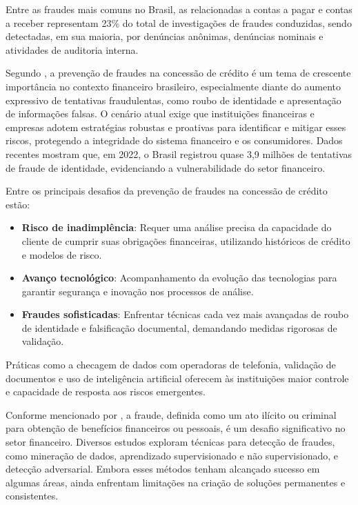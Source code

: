 \documentclass[12pt,a4paper]{article}
\begin{document}
Entre as fraudes mais comuns no Brasil, as relacionadas a contas a pagar e contas a receber representam 23\% do total de investigações de fraudes conduzidas, sendo detectadas, em sua maioria, por denúncias anônimas, denúncias nominais e atividades de auditoria interna.

Segundo \cite{thinkdata2024}, a prevenção de fraudes na concessão de crédito é um tema de crescente importância no contexto financeiro brasileiro, especialmente diante do aumento expressivo de tentativas fraudulentas, como roubo de identidade e apresentação de informações falsas. O cenário atual exige que instituições financeiras e empresas adotem estratégias robustas e proativas para identificar e mitigar esses riscos, protegendo a integridade do sistema financeiro e os consumidores. Dados recentes mostram que, em 2022, o Brasil registrou quase 3,9 milhões de tentativas de fraude de identidade, evidenciando a vulnerabilidade do setor financeiro.

Entre os principais desafios da prevenção de fraudes na concessão de crédito estão:
\begin{itemize}
    \item \textbf{Risco de inadimplência}: Requer uma análise precisa da capacidade do cliente de cumprir suas obrigações financeiras, utilizando históricos de crédito e modelos de risco.
    \item \textbf{Avanço tecnológico}: Acompanhamento da evolução das tecnologias para garantir segurança e inovação nos processos de análise.
    \item \textbf{Fraudes sofisticadas}: Enfrentar técnicas cada vez mais avançadas de roubo de identidade e falsificação documental, demandando medidas rigorosas de validação.
\end{itemize}

Práticas como a checagem de dados com operadoras de telefonia, validação de documentos e uso de inteligência artificial oferecem às instituições maior controle e capacidade de resposta aos riscos emergentes.

Conforme mencionado por \cite{maniraj2019}, a fraude, definida como um ato ilícito ou criminal para obtenção de benefícios financeiros ou pessoais, é um desafio significativo no setor financeiro. Diversos estudos exploram técnicas para detecção de fraudes, como mineração de dados, aprendizado supervisionado e não supervisionado, e detecção adversarial. Embora esses métodos tenham alcançado sucesso em algumas áreas, ainda enfrentam limitações na criação de soluções permanentes e consistentes.
\end{document}
